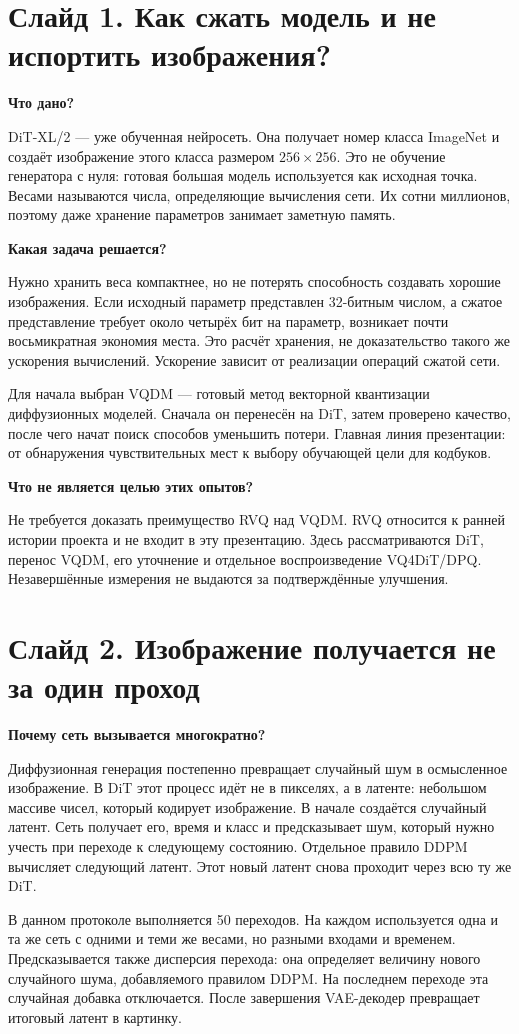 \documentclass[a4paper,11pt]{article}
\newcommand{\slide}[2]{\clearpage\section*{Слайд #1. #2}}
\newcommand{\question}[1]{\par\textbf{#1}\par}
\begin{document}
\slide{1}{Как сжать модель и не испортить изображения?}
\question{Что дано?}
DiT-XL/2 --- уже обученная нейросеть. Она получает номер класса ImageNet и
создаёт изображение этого класса размером $256\times256$. Это не обучение
генератора с нуля: готовая большая модель используется как исходная точка.
Весами называются числа, определяющие вычисления сети. Их сотни миллионов,
поэтому даже хранение параметров занимает заметную память.

\question{Какая задача решается?}
Нужно хранить веса компактнее, но не потерять способность создавать хорошие
изображения. Если исходный параметр представлен 32-битным числом, а сжатое
представление требует около четырёх бит на параметр, возникает почти
восьмикратная экономия места. Это расчёт хранения, не доказательство такого
же ускорения вычислений. Ускорение зависит от реализации операций сжатой сети.

Для начала выбран VQDM --- готовый метод векторной квантизации диффузионных
моделей. Сначала он перенесён на DiT, затем проверено качество, после чего
начат поиск способов уменьшить потери. Главная линия презентации:
от обнаружения чувствительных мест к выбору обучающей цели для кодбуков.

\question{Что не является целью этих опытов?}
Не требуется доказать преимущество RVQ над VQDM. RVQ относится к ранней
истории проекта и не входит в эту презентацию. Здесь рассматриваются DiT,
перенос VQDM, его уточнение и отдельное воспроизведение VQ4DiT/DPQ.
Незавершённые измерения не выдаются за подтверждённые улучшения.

\slide{2}{Изображение получается не за один проход}
\question{Почему сеть вызывается многократно?}
Диффузионная генерация постепенно превращает случайный шум в осмысленное
изображение. В DiT этот процесс идёт не в пикселях, а в латенте: небольшом
массиве чисел, который кодирует изображение. В начале создаётся случайный
латент. Сеть получает его, время и класс и предсказывает шум, который нужно
учесть при переходе к следующему состоянию. Отдельное правило DDPM вычисляет
следующий латент. Этот новый латент снова проходит через всю ту же DiT.

В данном протоколе выполняется 50 переходов. На каждом используется одна
и та же сеть с одними и теми же весами, но разными входами и временем.
Предсказывается также дисперсия перехода: она определяет величину нового
случайного шума, добавляемого правилом DDPM. На последнем переходе эта
случайная добавка отключается. После завершения VAE-декодер превращает
итоговый латент в картинку.
\end{document}
